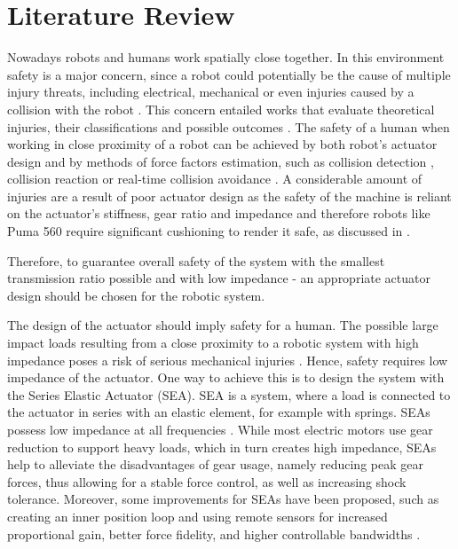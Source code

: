 \chapter{Literature Review}

Nowadays robots and humans work spatially close together. In this environment safety is a major concern, since a robot could potentially be the cause of multiple injury threats, including electrical, mechanical or even injuries caused by a collision with the robot \cite{eval_of_safety}. This concern entailed works that evaluate theoretical injuries, their classifications and possible outcomes \cite{safety}. The safety of a human when working in close proximity of a robot can be achieved by both robot's actuator design and by methods of force factors estimation, such as collision detection \cite{collision}, collision reaction \cite{coll_reac} or real-time collision avoidance \cite{coll_avoid}. A considerable amount of injuries are a result of poor actuator design \cite{intrinsic} as the safety of the machine is reliant on the actuator's stiffness, gear ratio and impedance and therefore robots like Puma 560 require significant cushioning to render it safe, as discussed in \cite{unsafe_manip}. 

Therefore, to guarantee overall safety of the system with the smallest transmission ratio possible and with low impedance - an appropriate actuator design should be chosen for the robotic system.


The design of the actuator should imply safety for a human. The possible large impact loads resulting from a close proximity to a robotic system with high impedance poses a risk of serious mechanical injuries \cite{unsafe_manip}. Hence, safety requires low impedance of the actuator.
One way to achieve this is to design the system with the Series Elastic Actuator (SEA). SEA is a system, where a load is connected to the actuator in series with an elastic element, for example with springs. SEAs possess low impedance at all frequencies \cite{sea}. While most electric motors use gear reduction to support heavy loads, which in turn creates high impedance, SEAs help to alleviate the disadvantages of gear usage, namely reducing peak gear forces, thus allowing for a stable force control, as well as increasing shock tolerance.
Moreover, some improvements for SEAs have been proposed, such as creating an inner position loop and using remote sensors for increased proportional gain, better force fidelity, and higher controllable bandwidths \cite{sea_improvs}.


